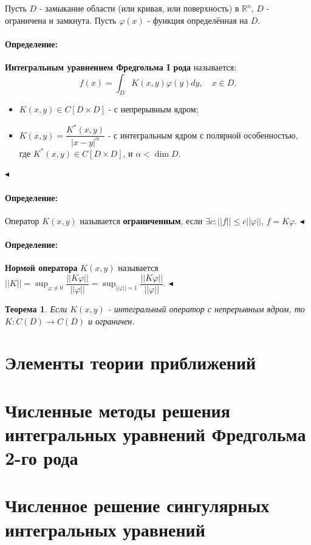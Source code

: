 \documentclass{article}
\newtheorem{theorem}{Теорема}
\newenvironment{definition}{ \paragraph{Определение:}}{\hfill $\blacktriangleleft$}
\begin{document}
\noindent
Пусть $D$ - замыкание области (или кривая, или поверхность) в $\mathbb{R}^n$, $D$ - ограничена и замкнута. Пусть $\varphi(x)$ - функция определённая на $D$. 
\begin{definition}
\textbf{Интегральным уравнением Фредгольма I рода} называется:
\begin{equation}
f(x) = \int_D K(x,y) \varphi(y)dy, \quad x \in D.
\end{equation}

\begin{itemize}
\item $K(x,y) \in C[D \times D]$ - с непрерывным ядром;
\item $K(x,y) = \dfrac{K^*(x,y)}{|x-y|^{\alpha}}$ - с интегральным ядром с полярной особенностью, где $K^*(x,y) \in C[D \times D]$, и $\alpha < \dim D$. 
\end{itemize}
\end{definition}

\begin{definition}
Оператор $K(x,y)$ называется \textbf{ограниченным}, если $\exists c: ||f|| \leqslant c ||\varphi||$, $f = K\varphi$.
\end{definition}

\begin{definition}
\textbf{Нормой оператора} $K(x,y)$ называется $||K|| = \sup_{\varphi \neq 0} \dfrac{||K\varphi||}{||\varphi||} = \sup_{||\varphi|| = 1} \dfrac{||K\varphi||}{||\varphi||}$.
\end{definition}

\begin{theorem}
Если $K(x,y)$ - интегральный оператор с непрерывным ядром, то $K: C(D) \to C(D)$ и ограничен.
\end{theorem}


\section{Элементы теории приближений}



\section{Численные методы решения интегральных уравнений Фредгольма 2-го рода}



\section{Численное решение сингулярных интегральных уравнений}
\end{document}
